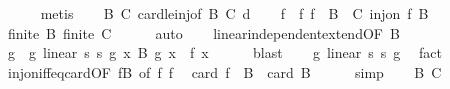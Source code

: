 \begin{isabellebody}
\ \ \ \ \isamarkupfalse%
\ metis\isanewline
\ \ \isamarkupfalse%
\ B{\isacharparenleft}{\kern0pt}{}{\isacharparenright}{\kern0pt}\ C{\isacharparenleft}{\kern0pt}{}{\isacharparenright}{\kern0pt}\ card{\isacharunderscore}{\kern0pt}le{\isacharunderscore}{\kern0pt}inj{\isacharbrackleft}{\kern0pt}of\ B\ C{\isacharbrackright}{\kern0pt}\ d\isanewline
\ \ \isamarkupfalse%
\ f\ \ f{\isacharcolon}{\kern0pt}\ {\isachardoublequoteopen}f\ {\isacharbackquote}{\kern0pt}\ B\ {\isasymsubseteq}\ C{\isachardoublequoteclose}\ {\isachardoublequoteopen}inj{\isacharunderscore}{\kern0pt}on\ f\ B{\isachardoublequoteclose}\ \isamarkupfalse%
\ {\isacartoucheopen}finite\ B{\isacartoucheclose}\ {\isacartoucheopen}finite\ C{\isacartoucheclose}\isanewline
\ \ \ \ \isamarkupfalse%
\ auto\isanewline
\ \ \isamarkupfalse%
\ linear{\isacharunderscore}{\kern0pt}independent{\isacharunderscore}{\kern0pt}extend{\isacharbrackleft}{\kern0pt}OF\ B{\isacharparenleft}{\kern0pt}{}{\isacharparenright}{\kern0pt}{\isacharbrackright}{\kern0pt}\isanewline
\ \ \isamarkupfalse%
\ g\ \ g{\isacharcolon}{\kern0pt}\ {\isachardoublequoteopen}linear\ s{}\ s{}\ g{\isachardoublequoteclose}\ {\isachardoublequoteopen}{\isasymforall}x{\isasymin}\ B{\isachardot}{\kern0pt}\ g\ x\ {\isacharequal}{\kern0pt}\ f\ x{\isachardoublequoteclose}\isanewline
\ \ \ \ \isamarkupfalse%
\ blast\isanewline
\ \ \isamarkupfalse%
\ g{\isacharcolon}{\kern0pt}\ linear\ s{}\ s{}\ g\ \isamarkupfalse%
\ fact\isanewline
\ \ \isamarkupfalse%
\ inj{\isacharunderscore}{\kern0pt}on{\isacharunderscore}{\kern0pt}iff{\isacharunderscore}{\kern0pt}eq{\isacharunderscore}{\kern0pt}card{\isacharbrackleft}{\kern0pt}OF\ fB{\isacharcomma}{\kern0pt}\ of\ f{\isacharbrackright}{\kern0pt}\ f{\isacharparenleft}{\kern0pt}{}{\isacharparenright}{\kern0pt}\ \isamarkupfalse%
\ {\isachardoublequoteopen}card\ {\isacharparenleft}{\kern0pt}f\ {\isacharbackquote}{\kern0pt}\ B{\isacharparenright}{\kern0pt}\ {\isacharequal}{\kern0pt}\ card\ B{\isachardoublequoteclose}\isanewline
\ \ \ \ \isamarkupfalse%
\ simp\isanewline
\ \ \isamarkupfalse%
\ B{\isacharparenleft}{\kern0pt}{}{\isacharparenright}{\kern0pt}\ C{\isacharparenleft}{\kern0pt}{}{\isacharparenright}{\kern0pt}\ \isamarkupfalse%

\end{isabellebody}
